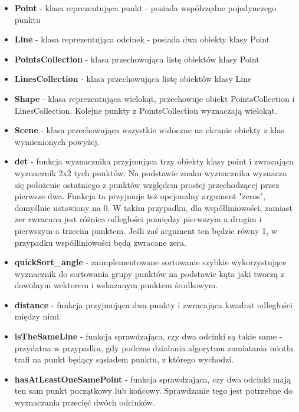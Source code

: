 \documentclass{article}
\begin{document}
\begin{itemize}

\item \textbf{Point} - klasa reprezentująca punkt - posiada współrzędne pojedynczego punktu

\item \textbf{Line} - klasa reprezentująca odcinek - posiada dwa obiekty klasy Point

\item \textbf{PointsCollection} - klasa przechowująca listę obiektów klasy Point

\item \textbf{LinesCollection} - klasa przechowująca listę obiektów klasy Line

\item \textbf{Shape} - klasa reprezentująca wielokąt, przechowuje obiekt PointsCollection i LinesCollection. Kolejne punkty z PointsCollection wyznaczają wielokąt.

\item \textbf{Scene} - klasa przechowująca wszystkie widoczne na ekranie obiekty z klas wymienionych powyżej.

\item \textbf{det} - funkcja wyznacznika przyjmująca trzy obiekty klasy point i zwracająca wyznacznik 2x2 tych punktów. Na podstawie znaku wyznacznika wyznacza się położenie ostatniego z punktów względem prostej przechodzącej przez pierwsze dwa. Funkcja ta przyjmuje też opcjonalny argument "zeros", domyślnie ustawiony na 0. W takim przypadku, dla współliniowości, zamiast zer zwracana jest różnica odległości pomiędzy pierwszym a drugim i pierwszym a trzecim punktem. Jeśli zaś argument ten będzie równy 1, w przypadku współliniowości będą zwracane zera.

\item \textbf{quickSort\_angle} - zaimplementowane sortowanie szybkie wykorzystujące wyznacznik do sortowania grupy punktów na podstawie kąta jaki tworzą z dowolnym wektorem i wskazanym punktem środkowym.

\item \textbf{distance} - funkcja przyjmująca dwa punkty i zwracająca kwadrat odległości między nimi.

\item \textbf{isTheSameLine} - funkcja sprawdzająca, czy dwa odcinki są takie same - przydatna w przypadku, gdy podczas działania algorytmu zamiatania miotła trafi na punkt będący sąsiadem punktu, z którego wychodzi.

\item \textbf{hasAtLeastOneSamePoint} - funkcja sprawdzająca, czy dwa odcinki mają ten sam punkt początkowy lub końcowy. Sprawdzanie tego jest potrzebne do wyznaczania przecięć dwóch odcinków.


\end{itemize}
\end{document}
